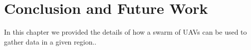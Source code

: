 \section{Conclusion and Future Work}
In this chapter we provided the details of how a swarm of UAVs can be used to gather data in a given region..